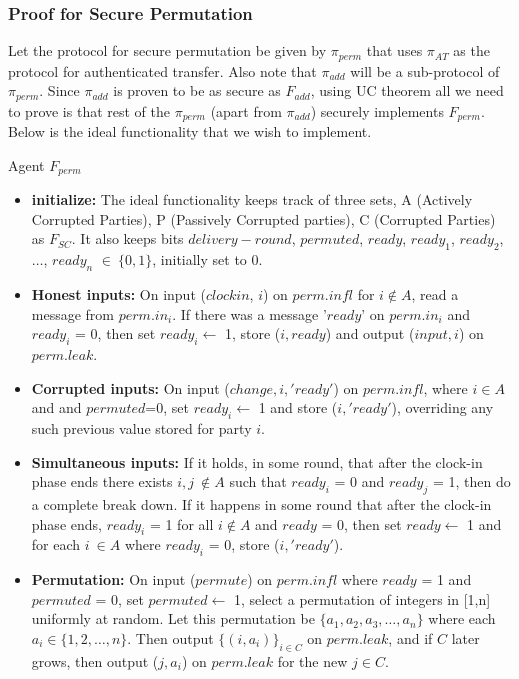 \documentclass{llncs}
\begin{document}
\subsubsection{Proof for Secure Permutation}
Let the protocol for secure permutation be given by $\pi_{perm}$ that uses $\pi_{AT}$ as the protocol for authenticated transfer. Also note that $\pi_{add}$ will be a sub-protocol of $\pi_{perm}$. Since $\pi_{add}$ is proven to be as secure as $F_{add}$, using UC theorem all we need to prove is that rest of the $\pi_{perm}$ (apart from $\pi_{add}$) securely implements $F_{perm}$. Below is the ideal functionality that we wish to implement.\\
\begin{framed}
\begin{center}
Agent $F_{perm}$
\end{center}
\begin{itemize}
\item \textbf{initialize:} The ideal functionality keeps track of three sets, A (Actively Corrupted Parties), P (Passively Corrupted parties), C (Corrupted Parties) as $F_{SC}$. It also keeps bits $delivery-round$, $permuted$, $ready$, $ready_1$, $ready_2$,$\dots$, $ready_n$ $ \in\ \{0,1\}$, 
initially set to 0.

\item \textbf{Honest inputs:} On input ($clockin$, $i$) on $perm.infl$ for $i \notin A$, read a message from $perm.in_i$. If there was a message '$ready$' on $perm.in_i$ and $ready_i$ = 0, then set $ready_i\leftarrow$  1, store ($i, ready$) and output ($input, i$) on $perm.leak$.

\item \textbf{Corrupted inputs:} On input ($change, i, 'ready'$) on $perm.infl$, where $i \in A$ and and $permuted$=0, set $ready_i \leftarrow$ 1 and store ($i,'ready'$), overriding any such previous value stored for party $i$.

\item \textbf{Simultaneous inputs:}  If it holds, in some round, that after the clock-in phase ends there exists $i,j\ \notin A$ such that $ready_i$ = 0 and $ready_j$ = 1, then do a complete break down. If it happens in some round that after the clock-in phase ends, $ready_i$ = 1 for all $i \notin A$ and $ready$ = 0, then set $ready \leftarrow$ 1 and for each $i\ \in A$ where $ready_i$ = 0, store ($i,'ready'$).

\item \textbf{Permutation:} On input ($permute$) on $perm.infl$ where $ready$ = 1 and $permuted$ = 0, set $permuted \leftarrow$ 1, select a permutation of integers in [1,n] uniformly at random. Let this permutation be $\{a_1, a_2, a_3, \dots, a_n \}$ where each $a_i \in \{1,2,\dots ,n\}$.  Then output 
$\{(i,a_i)\}_{i \in C}$ on $perm.leak$, and if $C$ later grows, then output ($j,a_i$) on $perm.leak$ for the new $j \in C$.


\end{itemize}
\end{framed}
\end{document}
